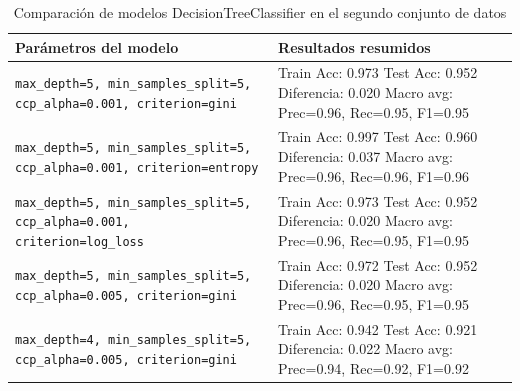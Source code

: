 \documentclass[conference]{IEEEtran}
\begin{document}
\begin{table}[h!]
    \centering
    \caption{Comparación de modelos DecisionTreeClassifier en el segundo conjunto de datos}
    \label{tab:comparacion_modelos_dt_extra}
    \setlength{\tabcolsep}{4pt}
    \renewcommand{\arraystretch}{1.3}
    \begin{tabular}{|>{\centering\arraybackslash}m{}|
                    >{\arraybackslash}m{}|}
        \hline
        \textbf{Parámetros del modelo} & \textbf{Resultados resumidos} \\
        \hline
        \texttt{max\_depth=5, min\_samples\_split=5, ccp\_alpha=0.001, criterion=gini} &
        Train Acc: 0.973 \newline 
        Test Acc: 0.952 \newline 
        Diferencia: 0.020 \newline 
        Macro avg: Prec=0.96, Rec=0.95, F1=0.95 \\
        \hline
        \texttt{max\_depth=5, min\_samples\_split=5, ccp\_alpha=0.001, criterion=entropy} &
        Train Acc: 0.997 \newline 
        Test Acc: 0.960 \newline 
        Diferencia: 0.037 \newline 
        Macro avg: Prec=0.96, Rec=0.96, F1=0.96 \\
        \hline
        \texttt{max\_depth=5, min\_samples\_split=5, ccp\_alpha=0.001, criterion=log\_loss} &
        Train Acc: 0.973 \newline 
        Test Acc: 0.952 \newline 
        Diferencia: 0.020 \newline 
        Macro avg: Prec=0.96, Rec=0.95, F1=0.95 \\
        \hline
        \texttt{max\_depth=5, min\_samples\_split=5, ccp\_alpha=0.005, criterion=gini} &
        Train Acc: 0.972 \newline 
        Test Acc: 0.952 \newline 
        Diferencia: 0.020 \newline 
        Macro avg: Prec=0.96, Rec=0.95, F1=0.95 \\
        \hline
        \texttt{max\_depth=4, min\_samples\_split=5, ccp\_alpha=0.005, criterion=gini} &
        Train Acc: 0.942 \newline 
        Test Acc: 0.921 \newline 
        Diferencia: 0.022 \newline 
        Macro avg: Prec=0.94, Rec=0.92, F1=0.92 \\
        \hline
    \end{tabular}
\end{table}
\end{document}
